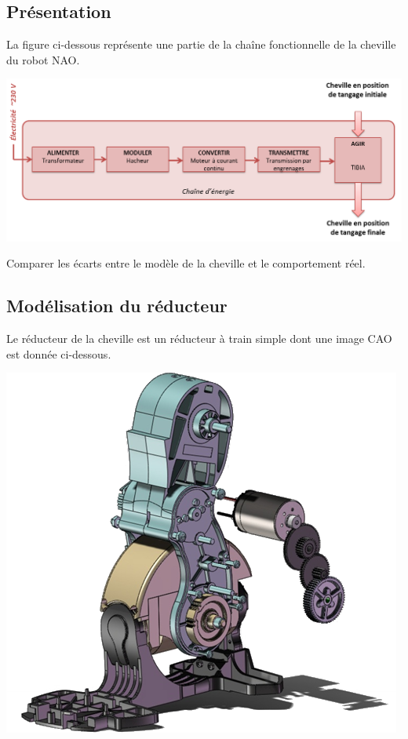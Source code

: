 \documentclass[10pt,fleqn]{article} %
\begin{document}

\vspace{5cm}
\pagestyle{fancy}
\thispagestyle{plain}

\def\columnseprulecolor{\color{ocre}}
\setlength{\columnseprule}{0.4pt} 

\def\pathfig{images}

\begin{multicols}{2}
\section*{Présentation}
La figure ci-dessous représente une partie de la chaîne fonctionnelle de la cheville du robot NAO.
\begin{center}
\includegraphics[width=\linewidth]{images/fig_02}
\end{center}

\begin{obj}
Comparer les écarts entre le modèle de la cheville et le comportement réel.
\end{obj}

\subsection*{Modélisation du réducteur}
Le réducteur de la cheville est un réducteur à train simple dont une image CAO est donnée ci-dessous.
\begin{center}
\includegraphics[width=.7\linewidth]{images/fig_03}
\end{center}


\end{multicols}
\end{document}
